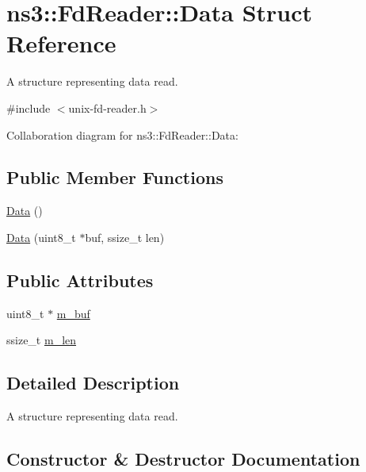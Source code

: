 \hypertarget{structns3_1_1FdReader_1_1Data}{}\section{ns3\+:\+:Fd\+Reader\+:\+:Data Struct Reference}
\label{structns3_1_1FdReader_1_1Data}


A structure representing data read.  




{\ttfamily \#include $<$unix-\/fd-\/reader.\+h$>$}



Collaboration diagram for ns3\+:\+:Fd\+Reader\+:\+:Data\+:
\subsection*{Public Member Functions}
\begin{DoxyCompactItemize}
\item 
\hyperlink{structns3_1_1FdReader_1_1Data_a3f6dc64c455d7d994c01f5da2ca34863}{Data} ()
\item 
\hyperlink{structns3_1_1FdReader_1_1Data_a395be39f5b6f5a1a9bc0720b5432b910}{Data} (uint8\+\_\+t $\ast$buf, ssize\+\_\+t len)
\end{DoxyCompactItemize}
\subsection*{Public Attributes}
\begin{DoxyCompactItemize}
\item 
uint8\+\_\+t $\ast$ \hyperlink{structns3_1_1FdReader_1_1Data_a5cf2757af7f37ae254303f68846bcdad}{m\+\_\+buf}
\item 
ssize\+\_\+t \hyperlink{structns3_1_1FdReader_1_1Data_a02b2cd322fe7109e176bbff562eef94d}{m\+\_\+len}
\end{DoxyCompactItemize}


\subsection{Detailed Description}
A structure representing data read. 

\subsection{Constructor \& Destructor Documentation}

